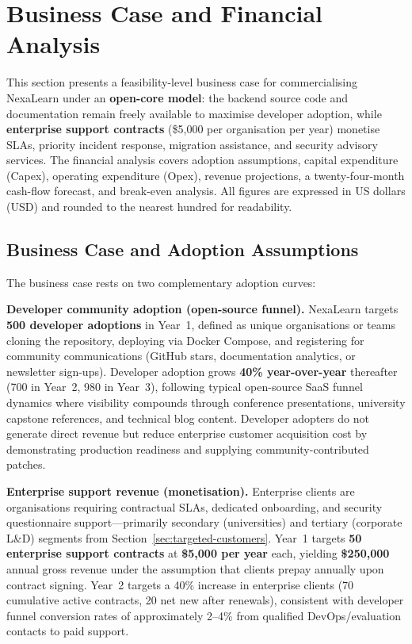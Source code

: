 
\section{Business Case and Financial Analysis}
\label{sec:business-case}

This section presents a feasibility-level business case for commercialising NexaLearn under an \textbf{open-core model}: the backend source code and documentation remain freely available to maximise developer adoption, while \textbf{enterprise support contracts} (\$5,000 per organisation per year) monetise SLAs, priority incident response, migration assistance, and security advisory services. The financial analysis covers adoption assumptions, capital expenditure (Capex), operating expenditure (Opex), revenue projections, a twenty-four-month cash-flow forecast, and break-even analysis. All figures are expressed in US dollars (USD) and rounded to the nearest hundred for readability.

\subsection{Business Case and Adoption Assumptions}
\label{subsec:business-case-adoption}

The business case rests on two complementary adoption curves:

\textbf{Developer community adoption (open-source funnel).}
NexaLearn targets \textbf{500 developer adoptions} in Year~1, defined as unique organisations or teams cloning the repository, deploying via Docker Compose, and registering for community communications (GitHub stars, documentation analytics, or newsletter sign-ups). Developer adoption grows \textbf{40\% year-over-year} thereafter (700 in Year~2, 980 in Year~3), following typical open-source SaaS funnel dynamics where visibility compounds through conference presentations, university capstone references, and technical blog content. Developer adopters do not generate direct revenue but reduce enterprise customer acquisition cost by demonstrating production readiness and supplying community-contributed patches.

\textbf{Enterprise support revenue (monetisation).}
Enterprise clients are organisations requiring contractual SLAs, dedicated onboarding, and security questionnaire support---primarily secondary (universities) and tertiary (corporate L\&D) segments from Section~\ref{sec:targeted-customers}. Year~1 targets \textbf{50 enterprise support contracts} at \textbf{\$5,000 per year} each, yielding \textbf{\$250,000} annual gross revenue under the assumption that clients prepay annually upon contract signing. Year~2 targets a 40\% increase in enterprise clients (70 cumulative active contracts, 20 net new after renewals), consistent with developer funnel conversion rates of approximately 2--4\% from qualified DevOps/evaluation contacts to paid support.

